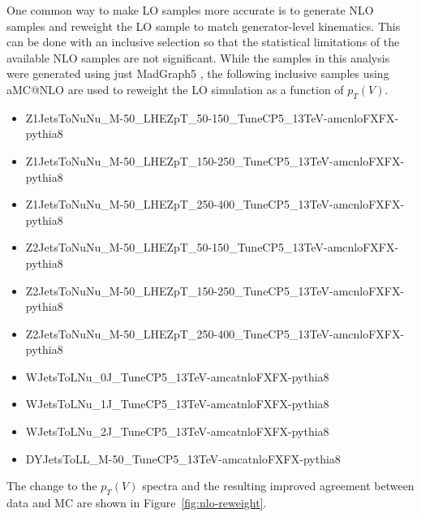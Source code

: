 One common way to make LO samples more accurate
is to generate NLO samples and reweight the LO sample
to match generator-level kinematics.
This can be done with an inclusive selection so that the statistical limitations
of the available NLO samples are not significant.
While the samples in this analysis were generated using just
MadGraph5 \cite{hirschi2015automated},
the following inclusive samples using aMC@NLO \cite{Alwall:2014hca}
are used to reweight the LO simulation as a function of $p_T(V)$.
\begin{itemize}
\item Z1JetsToNuNu\_M-50\_LHEZpT\_50-150\_TuneCP5\_13TeV-amcnloFXFX-pythia8
\item Z1JetsToNuNu\_M-50\_LHEZpT\_150-250\_TuneCP5\_13TeV-amcnloFXFX-pythia8
\item Z1JetsToNuNu\_M-50\_LHEZpT\_250-400\_TuneCP5\_13TeV-amcnloFXFX-pythia8
\item Z2JetsToNuNu\_M-50\_LHEZpT\_50-150\_TuneCP5\_13TeV-amcnloFXFX-pythia8
\item Z2JetsToNuNu\_M-50\_LHEZpT\_150-250\_TuneCP5\_13TeV-amcnloFXFX-pythia8
\item Z2JetsToNuNu\_M-50\_LHEZpT\_250-400\_TuneCP5\_13TeV-amcnloFXFX-pythia8
\item WJetsToLNu\_0J\_TuneCP5\_13TeV-amcatnloFXFX-pythia8
\item WJetsToLNu\_1J\_TuneCP5\_13TeV-amcatnloFXFX-pythia8
\item WJetsToLNu\_2J\_TuneCP5\_13TeV-amcatnloFXFX-pythia8
\item DYJetsToLL\_M-50\_TuneCP5\_13TeV-amcatnloFXFX-pythia8
\end{itemize}
The change to the $p_T(V)$ spectra and the resulting improved agreement between data and MC
are shown in Figure~\ref{fig:nlo-reweight}.
